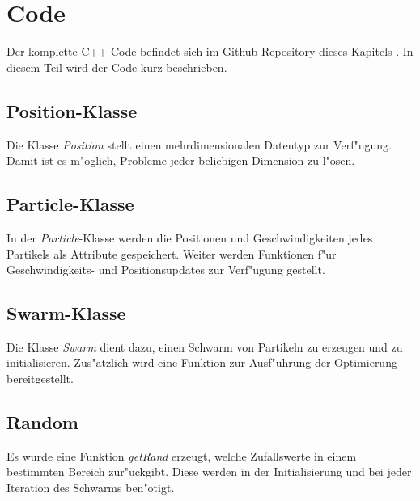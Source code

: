 \section{Code}
Der komplette C++ Code befindet sich im Github Repository dieses Kapitels
\cite{partikelschwarm:github}.
In diesem Teil wird der Code kurz beschrieben.

\subsection{Position-Klasse}
Die Klasse \textit{Position} stellt einen mehrdimensionalen Datentyp
zur Verf"ugung.
Damit ist es m"oglich, Probleme jeder beliebigen Dimension zu l"osen.

\subsection{Particle-Klasse}
In der \textit{Particle}-Klasse werden die Positionen und
Geschwindigkeiten jedes Partikels
als Attribute gespeichert. Weiter werden Funktionen f"ur Geschwindigkeits-
und Positionsupdates
zur Verf"ugung gestellt.

\subsection{Swarm-Klasse}
Die Klasse \textit{Swarm} dient dazu, einen Schwarm von Partikeln zu
erzeugen und zu initialisieren.
Zus"atzlich wird eine Funktion zur Ausf"uhrung der Optimierung bereitgestellt.

\subsection{Random}
Es wurde eine Funktion \textit{getRand} erzeugt, welche Zufallswerte in
einem bestimmten Bereich zur"uckgibt. Diese werden in der Initialisierung
und bei jeder Iteration des Schwarms ben"otigt.
